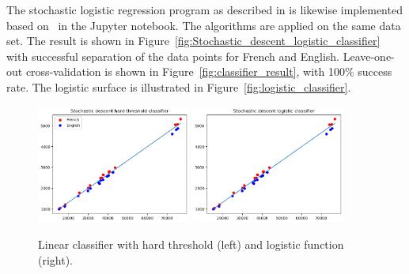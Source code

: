 \documentclass[a4paper]{article}
\begin{document}
The stochastic logistic regression program as described in \cite[pp. 702--705]{aima} is likewise implemented based on~\cite{nugues_lectures_2025} in the Jupyter notebook. The algorithms are applied on the same data set. The result is shown in Figure~\ref{fig:Stochastic_descent_logistic_classifier} with successful separation of the data points for French and English. Leave-one-out cross-validation is shown in Figure~\ref{fig:classifier_result}, with 100\% success rate. The logistic surface is illustrated in Figure~\ref{fig:logistic_classifier}.

\begin{figure}
    \centering
    \includegraphics[width=0.45\textwidth]{figures/Stochastic descent hard threshold classifier.png}
    \includegraphics[width=0.45\textwidth]{figures/Stoschastic descent logistic classifier.png}
    \caption{Linear classifier with hard threshold (left) and logistic function (right).}
    \label{fig:Stochastic_descent}
\end{figure}
\end{document}
